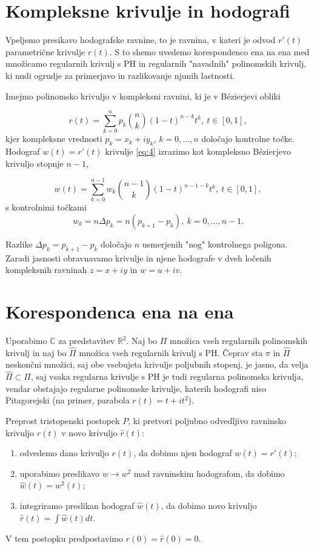 \documentclass[a4paper]{IEEEtran}
\begin{document}
	\section{Kompleksne krivulje in hodografi}
	Vpeljemo presikavo hodografske ravnine, to je ravnina, v kateri je odvod $r\prime (t)$ parametrične krivulje $r(t)$. S to shemo uvedemo korespondenco ena na ena med množicamo regularnih krivulj s PH in regularnih "navadnih" polinomskih krivulj, ki nudi ogrudje za primerjavo in razlikovanje njunih lastnosti.
	
	Imejmo polinomsko krivuljo v kompleksni ravnini, ki je v B\'ezierjevi obliki
	
	\begin{equation} \label{eq:4}
	r(t) = \displaystyle\sum_{k=0}^{n} p_k \binom{n}{k} (1-t)^{n-k}t^k, \ t \in [0,1],
	\end{equation}
	kjer kompleksne vrednosti $p_k=x_k+iy_k$, $k=0,...,n$ določajo kontrolne točke. Hodograf $w(t)=r\prime (t)$ krivulje \ref{eq:4} izrazimo kot kompleksno B\'ezierjevo krivuljo stopnje $n-1$,
	
	\begin{equation} \label{eq:5}
	w(t)=\displaystyle\sum_{k=0}^{n-1} w_k \binom{n-1}{k}(1-t)^{n-1-k}t^k, \ t \in [0,1],
	\end{equation}
	s kontrolnimi točkami
	\begin{equation}
	w_k=n \Delta p_k = n(p_{k+1}-p_k), \ k=0,...,n-1.
	\end{equation}
	
	Razlike $\Delta p_k = p_{k+1}-p_k$ določajo $n$ usmerjenih "nog" kontrolnega poligona. Zaradi jasnosti obravnavamo krivulje in njene hodografe v dveh ločenih kompleksnih ravninah $z=x+iy$ in $w=u+iv$.
	
	\section{Korespondenca ena na ena}
	Uporabimo $\mathbb{C}$ za predstavitev $\mathbb{R}^2$. Naj bo $\Pi$ množica vseh regularnih polinomskih krivulj in naj bo $\hat{\Pi}$ množica vseh regularnih krivulj s PH. Čeprav sta $\pi$ in $\hat{\Pi}$ neskončni množici, saj obe vsebujeta krivulje poljubnih stopenj, je jasno, da velja $\hat{\Pi} \subset \Pi$, saj vsaka regularna krivulje s PH je tudi regularna polinomska krivulja, vendar obstajajo regularne polinomske krivulje, katerih hodografi niso Pitagorejski (na primer, parabola $r(t) = t + i t^2$). 
	
	Preprost tristopenski postopek $P$, ki pretvori poljubno odvedljivo ravninsko krivuljo $r(t)$ v novo krivuljo $\hat{r}(t)$:
	\begin{enumerate}
	\item odvedemo dano krivuljo $r(t)$, da dobimo njen hodograf $w(t)=r'(t)$;
	\item uporabimo preslikavo $w \rightarrow w^2$ mad ravninskim hodografom, da dobimo $\hat{w}(t)=w^2(t)$;
	\item integriramo preslikan hodograf $\hat{w}(t)$, da dobimo novo krivuljo $\hat{r}(t)= \int \hat{w}(t)dt$.
	\end{enumerate}
	V tem postopku predpostavimo $r(0)= \hat{r}(0) = 0$.
	
\end{document}
